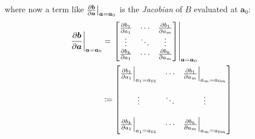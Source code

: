 %
where now a term like \(\evalat[\big]{\pdv{\bm{b}}{\bm{a}}}{\bm{a}=\bm{a}_0}\) is the \textit{Jacobian} of \(B\) evaluated at \(\bm{a}_0\):
%
\begin{align*}
    \evalat[\bigg]{\pdv{\bm{b}}{\bm{a}}}{\bm{a}=\bm{a}_0}
     & = \evalat*{
        \begin{bmatrix}
            \pdv{b_1}{a_1} & \cdots & \pdv{b_1}{a_m} \\
            \vdots         & \ddots & \vdots         \\
            \pdv{b_k}{a_1} & \cdots & \pdv{b_k}{a_m}
        \end{bmatrix}
    }{\bm{a}=\bm{a}_0} \\
     & \coloneqq
    \begin{bmatrix}
        \evalat[\Big]{\pdv{b_1}{a_1}}{a_1 = a_{01}} & \cdots & \evalat[\Big]{\pdv{b_1}{a_m}}{a_m = a_{0m}} \\
        \\
        \vdots                                      & \ddots & \vdots                                      \\
        \\
        \evalat[\Big]{\pdv{b_k}{a_1}}{a_1 = a_{01}} & \cdots & \evalat[\Big]{\pdv{b_k}{a_m}}{a_m = a_{0m}} \\
    \end{bmatrix}
\end{align*}
%

